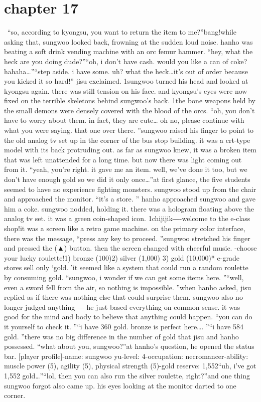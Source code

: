 \section{chapter 17}






 “so, according to kyongsu, you want to return the item to me?”bang!while asking that, sungwoo looked back, frowning at the sudden loud noise.
hanho was beating a soft drink vending machine with an orc femur hammer.
“hey, what the heck are you doing dude?”“oh, i don’t have cash.
 would you like a can of coke? hahaha…”“step aside.
 i have some.
 uh? what the heck…it’s out of order because you kicked it so hard!” jisu exclaimed.
1sungwoo turned his head and looked at kyongsu again.
 there was still tension on his face.
and kyongsu’s eyes were now fixed on the terrible skeletons behind sungwoo’s back.
1the bone weapons held by the small demons were densely covered with the blood of the orcs.
“oh, you don’t have to worry about them.
 in fact, they are cute… oh no, please continue with what you were saying.
 that one over there.
”sungwoo raised his finger to point to the old analog tv set up in the corner of the bus stop building.
 it was a crt-type model with its back protruding out.
 as far as sungwoo knew, it was a broken item that was left unattended for a long time.
 but now there was light coming out from it.
“yeah, you’re right.
 it gave me an item.
 well, we’ve done it too, but we don’t have enough gold so we did it only once…”at first glance, the five students seemed to have no experience fighting monsters.
 sungwoo stood up from the chair and approached the monitor.
“it’s a store.
” hanho approached sungwoo and gave him a coke.
 sungwoo nodded, holding it.
 there was a hologram floating above the analog tv set.
 it was a green coin-shaped icon.
1chijijik―-welcome to the e-class shop!it was a screen like a retro game machine.
 on the primary color interface, there was the message, “press any key to proceed.
”sungwoo stretched his finger and pressed the (▲) button.
 then the screen changed with cheerful music.
-choose your lucky roulette!1) bronze (100)2) silver (1,000)
3) gold (10,000)* e-grade stores sell only ‘gold.
’it seemed like a system that could run a random roulette by consuming gold.
“sungwoo, i wonder if we can get some items here.
”“well, even a sword fell from the air, so nothing is impossible.
”when hanho asked, jisu replied as if there was nothing else that could surprise them.
sungwoo also no longer judged anything — he just based everything on common sense.
 it was good for the mind and body to believe that anything could happen.
“you can do it yourself to check it.
”“i have 360 gold.
 bronze is perfect here….
”“i have 584 gold.
”there was no big difference in the number of gold that jisu and hanho possessed.
“what about you, sungwoo?”at hanho’s question, he opened the status bar.
[player profile]-name: sungwoo yu-level: 4-occupation: necromancer-ability: muscle power (5), agility (5), physical strength (5)-gold reserve: 1,552“uh, i’ve got 1,552 gold…”“lol, then you can also run the silver roulette, right?”and one thing sungwoo forgot also came up.
 his eyes looking at the monitor darted to one corner.

